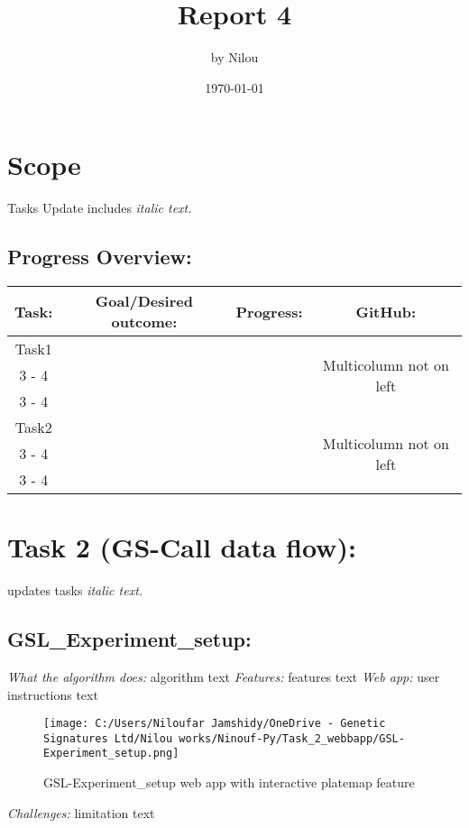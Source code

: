 \documentclass{article}%
\title{Report 4}%
\author{by Nilou}%
\date{\today}%
\begin{document}
%
\normalsize%
\maketitle%
\section{Scope}%
\label{sec:Scope}%
Tasks Update includes %
\textit{italic text. }%
\subsection{Progress Overview:}%
\label{subsec:ProgressOverview}%
\newline%
%
\newline%
%
\begin{tabular}{|c|c|c|c|}%
\hline%
\textbf{Task:}&\textbf{Goal/Desired outcome:}&\textbf{Progress:}&\textbf{GitHub:}\\%
\hline%
Task1&&&\multirow{3}{*}{Multicolumn not on left}\\%
\cline{3%
-%
4}%
&&&\\%
\cline{3%
-%
4}%
&&&\\%
\hline%
Task2&&&\multirow{3}{*}{Multicolumn not on left}\\%
\cline{3%
-%
4}%
&&&\\%
\cline{3%
-%
4}%
&&&\\%
\hline%
\end{tabular}

%
\section{Task 2 (GS{-}Call data flow):}%
\label{sec:Task2(GS{-}Calldataflow)}%
updates tasks %
\textit{italic text. }%
\subsection{GSL\_Experiment\_setup:}%
\label{subsec:GSLExperimentsetup}%
\textit{What the algorithm does: \newline%
}%
algorithm text%
\newline%
\newline%
\newline%
%
\textit{Features: }%
features text%
\newline%
%
\textit{Web app: }%
user instructions text%
\newline%
%


\begin{figure}[h!]%
\centering%
\texttt{[image: C:/Users/Niloufar Jamshidy/OneDrive - Genetic Signatures Ltd/Nilou works/Ninouf-Py/Task\_2\_webbapp/GSL-Experiment\_setup.png]}%
\caption{GSL{-}Experiment\_setup web app with interactive platemap feature}%
\end{figure}

%
\newline%
%
\textit{Challenges: }%
limitation text%
\newline%

%
\end{document}
